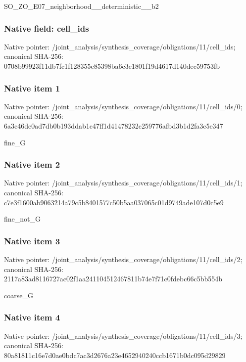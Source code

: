 \documentclass[10pt,a4paper]{article}
\begin{document}
\begingroup\raggedright\sloppy SO\_\allowbreak{}ZO\_\allowbreak{}E07\_\allowbreak{}neighborhood\_\allowbreak{}\_\allowbreak{}deterministic\_\allowbreak{}\_\allowbreak{}b2\par\endgroup

\subsubsection{Native field: cell\_\allowbreak{}ids}
Native pointer: /joint\_\allowbreak{}analysis/synthesis\_\allowbreak{}coverage/obligations/11/cell\_\allowbreak{}ids; canonical SHA-256: 0708b99923f11db7fc1f128355e85398ba6c3e1801f19d4617d140dec59753fb

\subsubsection{Native item 1}
Native pointer: /joint\_\allowbreak{}analysis/synthesis\_\allowbreak{}coverage/obligations/11/cell\_\allowbreak{}ids/0; canonical SHA-256: 6a3c46de0ad7db0b193ddab1c47ff1d41478232c259776afbd3b1d2fa3c5e347

\begingroup\raggedright\sloppy fine\_\allowbreak{}G\par\endgroup

\subsubsection{Native item 2}
Native pointer: /joint\_\allowbreak{}analysis/synthesis\_\allowbreak{}coverage/obligations/11/cell\_\allowbreak{}ids/1; canonical SHA-256: c7e3f1600ab9063214a79c5b8401577c50b5aa037065c01d9749ade107d0c5e9

\begingroup\raggedright\sloppy fine\_\allowbreak{}not\_\allowbreak{}G\par\endgroup

\subsubsection{Native item 3}
Native pointer: /joint\_\allowbreak{}analysis/synthesis\_\allowbreak{}coverage/obligations/11/cell\_\allowbreak{}ids/2; canonical SHA-256: 2117a83ad8116727ac02f1aa241104512467811b74e7f71c0fdebc66c5bb554b

\begingroup\raggedright\sloppy coarse\_\allowbreak{}G\par\endgroup

\subsubsection{Native item 4}
Native pointer: /joint\_\allowbreak{}analysis/synthesis\_\allowbreak{}coverage/obligations/11/cell\_\allowbreak{}ids/3; canonical SHA-256: 80a81811c16e7d0ae0bdc7ac3d2676a23e4652940240ccb1671b0dc095d29829
\end{document}
